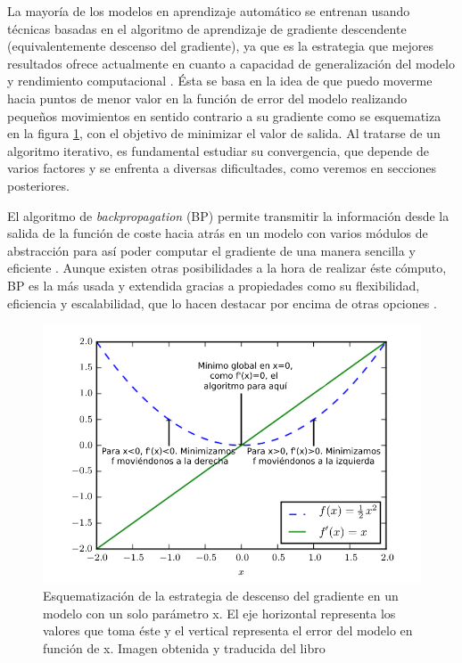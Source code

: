 La mayoría de los modelos en aprendizaje automático se entrenan usando técnicas basadas en el algoritmo de aprendizaje de gradiente descendente (equivalentemente descenso del gradiente), ya que es la estrategia que mejores resultados ofrece actualmente en cuanto a capacidad de generalización del modelo y rendimiento computacional \cite{GoodFellowBook, CauchyGD}. Ésta se basa en la idea de que puedo moverme hacia puntos de menor valor en la función de error del modelo realizando pequeños movimientos en  sentido contrario a su gradiente como se esquematiza en la figura \ref{fig:1.GD}, con el objetivo de minimizar el valor de salida. Al tratarse de un algoritmo iterativo, es fundamental estudiar su convergencia, que depende de varios factores y se enfrenta a diversas dificultades, como veremos en secciones posteriores.

El algoritmo de \textit{backpropagation} (BP) permite transmitir la información desde la salida de la función de coste hacia atrás en un modelo con varios módulos de abstracción para así poder computar el gradiente de una manera sencilla y eficiente \cite{rumelbackprop}. Aunque existen otras posibilidades a la hora de realizar éste cómputo, BP es la más usada y extendida gracias a propiedades como su flexibilidad, eficiencia y escalabilidad, que lo hacen destacar por encima de otras opciones \cite{GoodFellowBook}. 

\begin{figure}
    \centering
    \includegraphics[width=0.75\linewidth]{Plantilla_TFG_latex//imagenes//Mat//1.intro/1.1GDMatIntroGoodFellowBook.png}
    \caption{Esquematización de la estrategia de descenso del gradiente en un modelo con un solo parámetro x. El eje horizontal representa los valores que toma éste y el vertical representa el error del modelo en función de x. Imagen obtenida y traducida del libro \cite{GoodFellowBook}}
    \label{fig:1.GD}
\end{figure}




